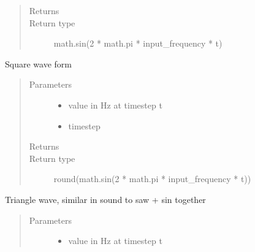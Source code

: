 \documentclass[letterpaper,10pt,english,openany,oneside]{sphinxmanual}
\begin{document}
\begin{fulllineitems}
\begin{fulllineitems}
\begin{quote}
\begin{description}
\item[{Returns}] \leavevmode
\sphinxAtStartPar


\item[{Return type}] \leavevmode
\sphinxAtStartPar
math.sin(2 * math.pi * input\_frequency * t)

\end{description}\end{quote}

\end{fulllineitems}



\begin{fulllineitems}
\sphinxAtStartPar
Square wave form
\begin{quote}\begin{description}
\item[{Parameters}] \leavevmode\begin{itemize}
\item {} 
\sphinxAtStartPar
{} \textendash{} value in Hz at timestep t

\item {} 
\sphinxAtStartPar
{} \textendash{} timestep

\end{itemize}

\item[{Returns}] \leavevmode
\sphinxAtStartPar


\item[{Return type}] \leavevmode
\sphinxAtStartPar
round(math.sin(2 * math.pi * input\_frequency * t))

\end{description}\end{quote}

\end{fulllineitems}



\begin{fulllineitems}
\sphinxAtStartPar
Triangle wave, similar in sound to saw + sin together
\begin{quote}\begin{description}
\item[{Parameters}] \leavevmode\begin{itemize}
\item {} 
\sphinxAtStartPar
{} \textendash{} value in Hz at timestep t


\end{itemize}
\end{description}
\end{quote}
\end{fulllineitems}
\end{fulllineitems}
\end{document}
